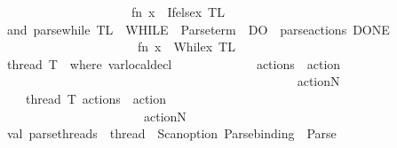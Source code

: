 \begin{isabellebody}
\ \ \ \ \ \ \ \ \ \ \ \ \ \ \ \ \ \ \ \ {\isachargreater}{\kern0pt}{\isachargreater}{\kern0pt}{\isacharparenleft}{\kern0pt}fn\ {\isacharparenleft}{\kern0pt}x{\isacharparenright}{\kern0pt}\ {\isacharequal}{\kern0pt}{\isachargreater}{\kern0pt}\ Ifelse{\isacharparenleft}{\kern0pt}x{\isacharparenright}{\kern0pt}{\isacharparenright}{\kern0pt}{\isacharparenright}{\kern0pt}\ TL\isanewline
and\ parse{\isacharunderscore}{\kern0pt}while\ TL\ {\isacharequal}{\kern0pt}{\isacharparenleft}{\kern0pt}{\isacharparenleft}{\kern0pt}\ \isactrlkeyword {\isasymopen}WHILE{\isasymclose}\ {\isacharbar}{\kern0pt}{\isacharminus}{\kern0pt}{\isacharminus}{\kern0pt}\ Parse{\isachardot}{\kern0pt}term\ {\isacharminus}{\kern0pt}{\isacharminus}{\kern0pt}{\isacharbar}{\kern0pt}\ \isactrlkeyword {\isasymopen}DO{\isasymclose}\ {\isacharminus}{\kern0pt}{\isacharminus}{\kern0pt}\ parse{\isacharunderscore}{\kern0pt}actions\ {\isacharminus}{\kern0pt}{\isacharminus}{\kern0pt}{\isacharbar}{\kern0pt}\isactrlkeyword {\isasymopen}DONE{\isasymclose}{\isacharparenright}{\kern0pt}\isanewline
\ \ \ \ \ \ \ \ \ \ \ \ \ \ \ \ \ \ \ \ {\isachargreater}{\kern0pt}{\isachargreater}{\kern0pt}\ {\isacharparenleft}{\kern0pt}fn\ {\isacharparenleft}{\kern0pt}x{\isacharparenright}{\kern0pt}\ {\isacharequal}{\kern0pt}{\isachargreater}{\kern0pt}\ While{\isacharparenleft}{\kern0pt}x{\isacharparenright}{\kern0pt}{\isacharparenright}{\kern0pt}{\isacharparenright}{\kern0pt}\ TL\isanewline
\isanewline
\isanewline
\ \ \ \ \ \ \ \ \ \ \ \ \ \ \ \ \ \ \ \ \ \ \ \ \ \ \ \ \ \ \ \ \isanewline
\isanewline
{\isacharparenleft}{\kern0pt}{\isacharasterisk}{\kern0pt}thread\ T{}\ {\isacharcolon}{\kern0pt}\ where\ var{\isacharunderscore}{\kern0pt}local{\isacharunderscore}{\kern0pt}decl\isanewline
\ \ \ \ \ \ \ \ \ \ \ \ \ actions\ \ action{}{\isacharsemicolon}{\kern0pt}\isanewline
\ \ \ \ \ \ \ \ \ \ \ \ \ \ \ \ \ \ \ \ \ \ \ {\isachardot}{\kern0pt}{\isachardot}{\kern0pt}{\isachardot}{\kern0pt}\ {\isacharsemicolon}{\kern0pt}\isanewline
\ \ \ \ \ \ \ \ \ \ \ \ \ \ \ \ \ \ \ \ \ \ actionN{\isacharsemicolon}{\kern0pt}\isanewline
\ \ \ thread\ T{}{\isacharcolon}{\kern0pt}\ actions\ \ action{}{\isacharsemicolon}{\kern0pt}\isanewline
\ \ \ \ \ \ \ \ \ \ \ \ \ \ \ \ \ \ \ \ \ \ \ {\isachardot}{\kern0pt}{\isachardot}{\kern0pt}{\isachardot}{\kern0pt}\ {\isacharsemicolon}{\kern0pt}\isanewline
\ \ \ \ \ \ \ \ \ \ \ \ \ \ \ \ \ \ \ \ \ \ actionN{\isacharsemicolon}{\kern0pt}\isanewline
\ {\isacharasterisk}{\kern0pt}{\isacharparenright}{\kern0pt}\isanewline
val\ parse{\isacharunderscore}{\kern0pt}threads\ {\isacharequal}{\kern0pt}{\isacharparenleft}{\kern0pt}\ \isactrlkeyword {\isasymopen}thread{\isasymclose}\ {\isacharbar}{\kern0pt}{\isacharminus}{\kern0pt}{\isacharminus}{\kern0pt}\ {\isacharparenleft}{\kern0pt}Scan{\isachardot}{\kern0pt}option\ {\isacharparenleft}{\kern0pt}Parse{\isachardot}{\kern0pt}binding{\isacharparenright}{\kern0pt}{\isacharparenright}{\kern0pt}\ {\isacharminus}{\kern0pt}{\isacharminus}{\kern0pt}{\isacharbar}{\kern0pt}\ Parse{\isachardot}{\kern0pt}{\isachardollar}{\kern0pt}{\isachardollar}{\kern0pt}{\isachardollar}{\kern0pt}\ {\isachardoublequote}{\kern0pt}{\isacharcolon}{\kern0pt}{\isachardoublequote}{\kern0pt}\isanewline

\end{isabellebody}
